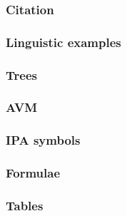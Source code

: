 




\begin{frame}
\frametitle{Citation}

\end{frame}

\begin{frame}
\frametitle{Linguistic examples}

\end{frame}

\begin{frame}
\frametitle{Trees}

\end{frame}

\begin{frame}
\frametitle{AVM}

\end{frame}

\begin{frame}
\frametitle{IPA symbols}

\end{frame}

\begin{frame}
\frametitle{Formulae}

\end{frame}

\begin{frame}
\frametitle{Tables}

\end{frame}
